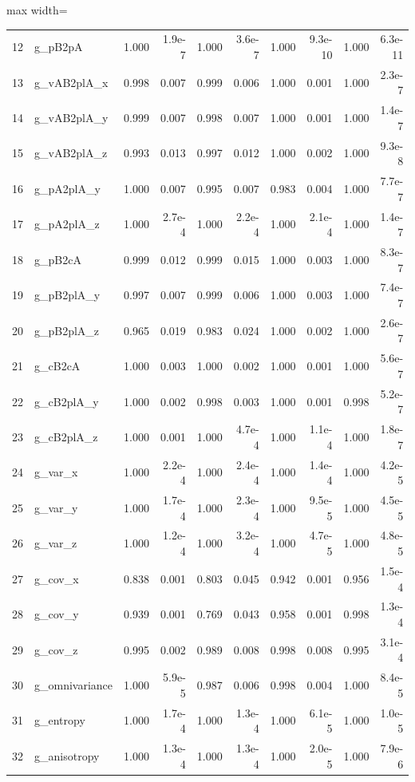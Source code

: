 \begin{table}[t!]
\begin{adjustbox}{max width=\textwidth}
\begin{tabular}{llrrrrrrrr}
12 & g\_pB2pA & 1.000 & 1.9e-7 & 1.000 & 3.6e-7 & 1.000 & 9.3e-10 & 1.000 & 6.3e-11 \\
13 & g\_vAB2plA\_x & 0.998 & 0.007 & 0.999 & 0.006 & 1.000 & 0.001 & 1.000 & 2.3e-7 \\
14 & g\_vAB2plA\_y & 0.999 & 0.007 & 0.998 & 0.007 & 1.000 & 0.001 & 1.000 & 1.4e-7 \\
15 & g\_vAB2plA\_z & 0.993 & 0.013 & 0.997 & 0.012 & 1.000 & 0.002 & 1.000 & 9.3e-8 \\
16 & g\_pA2plA\_y & 1.000 & 0.007 & 0.995 & 0.007 & 0.983 & 0.004 & 1.000 & 7.7e-7 \\
17 & g\_pA2plA\_z & 1.000 & 2.7e-4 & 1.000 & 2.2e-4 & 1.000 & 2.1e-4 & 1.000 & 1.4e-7 \\
18 & g\_pB2cA & 0.999 & 0.012 & 0.999 & 0.015 & 1.000 & 0.003 & 1.000 & 8.3e-7 \\
19 & g\_pB2plA\_y & 0.997 & 0.007 & 0.999 & 0.006 & 1.000 & 0.003 & 1.000 & 7.4e-7 \\
20 & g\_pB2plA\_z & 0.965 & 0.019 & 0.983 & 0.024 & 1.000 & 0.002 & 1.000 & 2.6e-7 \\
21 & g\_cB2cA & 1.000 & 0.003 & 1.000 & 0.002 & 1.000 & 0.001 & 1.000 & 5.6e-7 \\
22 & g\_cB2plA\_y & 1.000 & 0.002 & 0.998 & 0.003 & 1.000 & 0.001 & 0.998 & 5.2e-7 \\
23 & g\_cB2plA\_z & 1.000 & 0.001 & 1.000 & 4.7e-4 & 1.000 & 1.1e-4 & 1.000 & 1.8e-7 \\
24 & g\_var\_x & 1.000 & 2.2e-4 & 1.000 & 2.4e-4 & 1.000 & 1.4e-4 & 1.000 & 4.2e-5 \\
25 & g\_var\_y & 1.000 & 1.7e-4 & 1.000 & 2.3e-4 & 1.000 & 9.5e-5 & 1.000 & 4.5e-5 \\
26 & g\_var\_z & 1.000 & 1.2e-4 & 1.000 & 3.2e-4 & 1.000 & 4.7e-5 & 1.000 & 4.8e-5 \\
27 & g\_cov\_x & 0.838 & 0.001 & 0.803 & 0.045 & 0.942 & 0.001 & 0.956 & 1.5e-4 \\
28 & g\_cov\_y & 0.939 & 0.001 & 0.769 & 0.043 & 0.958 & 0.001 & 0.998 & 1.3e-4 \\
29 & g\_cov\_z & 0.995 & 0.002 & 0.989 & 0.008 & 0.998 & 0.008 & 0.995 & 3.1e-4 \\
30 & g\_omnivariance & 1.000 & 5.9e-5 & 0.987 & 0.006 & 0.998 & 0.004 & 1.000 & 8.4e-5 \\
31 & g\_entropy & 1.000 & 1.7e-4 & 1.000 & 1.3e-4 & 1.000 & 6.1e-5 & 1.000 & 1.0e-5 \\
32 & g\_anisotropy & 1.000 & 1.3e-4 & 1.000 & 1.3e-4 & 1.000 & 2.0e-5 & 1.000 & 7.9e-6 \\

\end{tabular}
\end{adjustbox}
\end{table}
